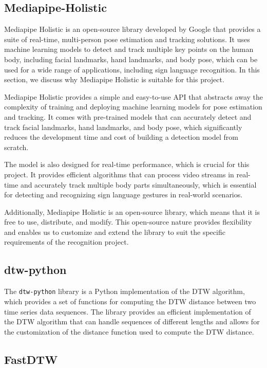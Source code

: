 \documentclass[final,rdr32.tex]{subfiles}
\begin{document}
\subsection{Mediapipe-Holistic}

Mediapipe Holistic is an open-source library developed by Google that provides a suite of real-time, multi-person pose estimation and tracking solutions. It uses machine learning models to detect and track multiple key points on the human body, including facial landmarks, hand landmarks, and body pose, which can be used for a wide range of applications, including sign language recognition. In this section, we discuss why Mediapipe Holistic is suitable for this project.

Mediapipe Holistic provides a simple and easy-to-use API that abstracts away the complexity of training and deploying machine learning models for pose estimation and tracking. It comes with pre-trained models that can accurately detect and track facial landmarks, hand landmarks, and body pose, which significantly reduces the development time and cost of building a detection model from scratch.

The model is also designed for real-time performance, which is crucial for this project. It provides efficient algorithms that can process video streams in real-time and accurately track multiple body parts simultaneously, which is essential for detecting and recognizing sign language gestures in real-world scenarios.

Additionally, Mediapipe Holistic is an open-source library, which means that it is free to use, distribute, and modify. This open-source nature provides flexibility and enables us to customize and extend the library to suit the specific requirements of the recognition project.

\subsection{dtw-python}

The \verb|dtw-python| library is a Python implementation of the DTW algorithm, which provides a set of functions for computing the DTW distance between two time series data sequences. The library provides an efficient implementation of the DTW algorithm that can handle sequences of different lengths and allows for the customization of the distance function used to compute the DTW distance.

\subsection{FastDTW}
\end{document}
